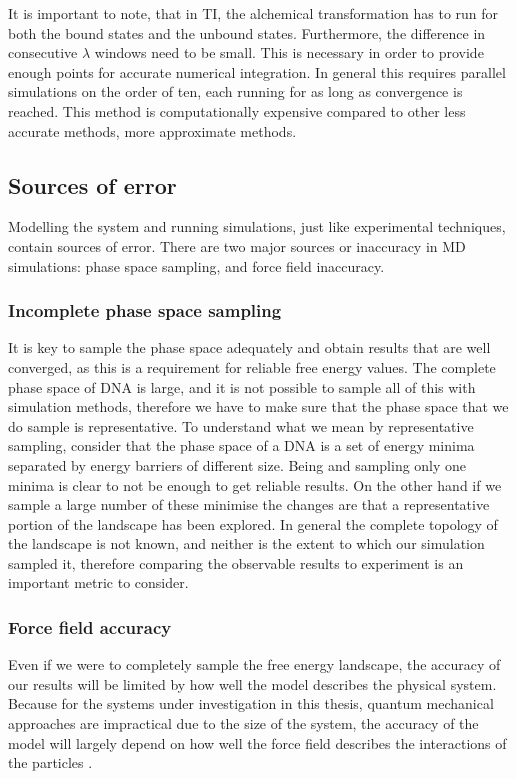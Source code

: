 \documentclass[11pt, a4paper]{report}
\begin{document}
It is important to note, that in TI, the alchemical transformation has to run for both the bound states and the unbound states. Furthermore, the difference in consecutive $\lambda$ windows need to be small. This is necessary in order to provide enough points for accurate numerical integration. In general this requires parallel simulations on the order of ten, each running for as long as convergence is reached. This method is computationally expensive compared to other less accurate methods, more approximate methods.



\subsection{Sources of error}

Modelling the system and running simulations, just like experimental techniques, contain sources of error. There are two major sources or inaccuracy in MD simulations: phase space sampling, and force field inaccuracy.

\subsubsection{Incomplete phase space sampling}

It is key to sample the phase space adequately and obtain results that are well converged, as this is a requirement for reliable free energy values. The complete phase space of DNA is large, and it is not possible to sample all of this with simulation methods, therefore we have to make sure that the phase space that we do sample is representative. To understand what we mean by representative sampling, consider that the phase space of a DNA is a set of energy minima separated by energy barriers of different size. Being and sampling only one minima is clear to not be enough to get reliable results. On the other hand if we sample a large number of these minimise the changes are that a representative portion of the landscape has been explored. In general the complete topology of the landscape is not known, and neither is the extent to which our simulation sampled it, therefore comparing the observable results to experiment is an important metric to consider.

\subsubsection{Force field accuracy}

Even if we were to completely sample the free energy landscape, the accuracy of our results will be limited by how well the model describes the physical system. Because for the systems under investigation in this thesis, quantum mechanical approaches are impractical due to the size of the system, the accuracy of the model will largely depend on how well the force field describes the interactions of the particles \cite{dnaforcefieldcomp}.









\end{document}
